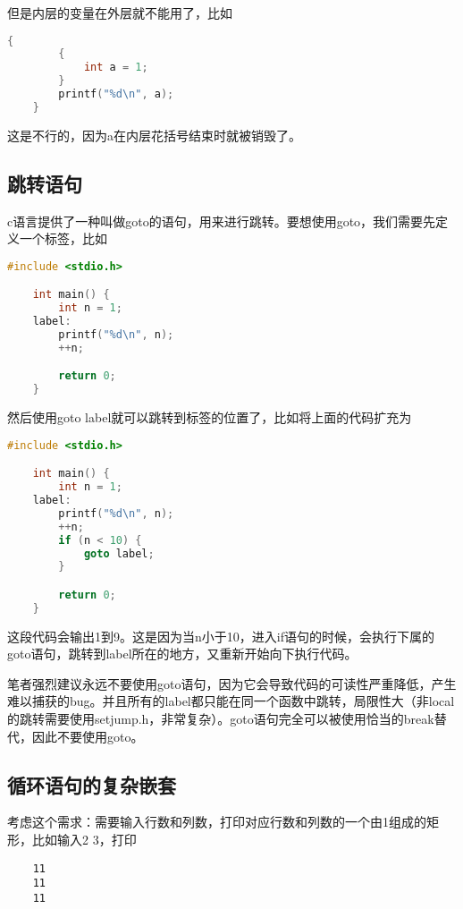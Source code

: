 但是内层的变量在外层就不能用了，比如

\begin{lstlisting}[language=c]
    {
        {
            int a = 1;
        }
        printf("%d\n", a);
    }
\end{lstlisting}

这是不行的，因为a在内层花括号结束时就被销毁了。

\subsection{跳转语句}

c语言提供了一种叫做goto的语句，用来进行跳转。要想使用goto，我们需要先定义一个标签，比如

\begin{lstlisting}[language=c]
    #include <stdio.h>

    int main() {
        int n = 1;
    label:
        printf("%d\n", n);
        ++n;

        return 0;
    }
\end{lstlisting}

然后使用goto label就可以跳转到标签的位置了，比如将上面的代码扩充为

\begin{lstlisting}[language=c]
    #include <stdio.h>

    int main() {
        int n = 1;
    label:
        printf("%d\n", n);
        ++n;
        if (n < 10) {
            goto label;
        }

        return 0;
    }
\end{lstlisting}

这段代码会输出1到9。这是因为当n小于10，进入if语句的时候，会执行下属的goto语句，跳转到label所在的地方，又重新开始向下执行代码。

笔者强烈建议永远不要使用goto语句，因为它会导致代码的可读性严重降低，产生难以捕获的bug。并且所有的label都只能在同一个函数中跳转，局限性大（非local的跳转需要使用setjump.h，非常复杂）。goto语句完全可以被使用恰当的break替代，因此不要使用goto。

\subsection{循环语句的复杂嵌套}

考虑这个需求：需要输入行数和列数，打印对应行数和列数的一个由1组成的矩形，比如输入2 3，打印

\begin{mdframed}
\begin{verbatim}
    11
    11
    11
\end{verbatim}
\end{mdframed}

